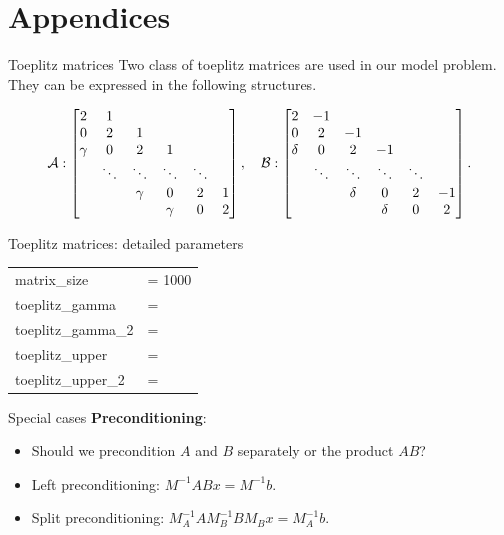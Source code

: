 \documentclass[aspectratio=169]{beamer}
\begin{document}
\section{Appendices}
\begin{frame}{Toeplitz matrices}
	Two class of toeplitz matrices are used in our model problem. They can be expressed in the following structures.

\begin{equation}\label{toemat}
	\mathcal{A}: \begin{bmatrix}
	2 & 1& & & & \\
	0& 2& 1& & & \\
	\gamma&0 & 2& 1& & \\
	& \ddots&\ddots & \ddots& \ddots& \\
	& & \gamma&0 & 2& 1\\
	& & & \gamma& 0& 2
\end{bmatrix},
\quad
\mathcal{B}:
\begin{bmatrix}
	2 & -1& & & & \\
	0& 2& -1& & & \\
	\delta&0 & 2& -1& & \\
	& \ddots&\ddots & \ddots& \ddots& \\
	& & \delta&0 & 2& -1\\
	& & & \delta& 0& 2
\end{bmatrix}
.
\end{equation}
\end{frame}

\begin{frame}[fragile]{Toeplitz matrices: detailed parameters}
	\centering
	\begin{jm}
		\begin{tabular}{l l}
			matrix\_size & = 1000	\\
			toeplitz\_gamma & = \\
			toeplitz\_gamma\_2 & = \\
			toeplitz\_upper & = \\
			toeplitz\_upper\_2 & = \\
		\end{tabular}
	\end{jm}
\end{frame}

\begin{frame}{Special cases}
	\textbf{Preconditioning}:
	\begin{itemize}
		\item Should we precondition $A$ and $B$ separately or the product $AB$?
		\item Left preconditioning: $M^{-1}ABx = M^{-1}b$.
		\item Split preconditioning: $M_A^{-1}AM_B^{-1}BM_B x = M_A^{-1}b$.
	\end{itemize}
\end{frame}
\end{document}
